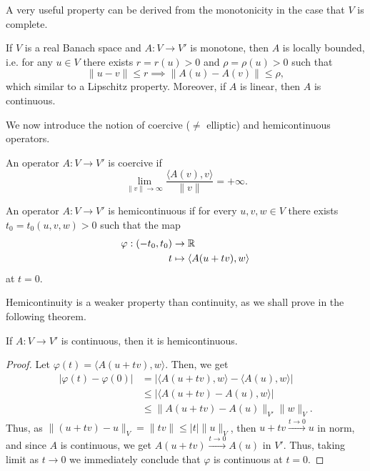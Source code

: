 A very useful property can be derived from the monotonicity in the case that $V$ is complete.
\begin{theorem}
    If $V$ is a real Banach space and $A:V\to V'$ is monotone, then $A$ is locally bounded, i.e. for any $u\in V$ there exists $r=r(u)>0$ and $\rho=\rho(u)>0$ such that
    \begin{equation*}
        \|u-v\|\leq r \implies \|A(u)-A(v)\|\leq \rho,
    \end{equation*}
    which similar to a Lipschitz property. Moreover, if $A$ is linear, then $A$ is continuous.
\end{theorem}
We now introduce the notion of coercive ($\neq$ elliptic) and hemicontinuous operators.
\begin{definition}
    An operator $A:V\to V'$ is coercive if 
    \begin{equation*}
        \lim_{\|v\|\to \infty} \frac{\langle A(v),v\rangle}{\|v\|} = +\infty.
    \end{equation*}
\end{definition}
\begin{definition}
    An operator $A:V\to V'$ is hemicontinuous if for every $u,v,w\in V$ there exists $t_0=t_0(u,v,w)>0$ such that the map 
    \begin{align*}
        \varphi:(-t_0,t_0)&\to \mathbb{R}\\
        t&\mapsto \langle A(u+tv),w\rangle
    \end{align*}
    at $t=0$. 
\end{definition}
Hemicontinuity is a weaker property than continuity, as we shall prove in the following theorem.
\begin{theorem}
    If $A:V\to V'$ is continuous, then it is hemicontinuous.
    \begin{proof}
        Let $\varphi(t)=\langle A(u+tv),w\rangle$. Then, we get
        \begin{align*}
            |\varphi(t)-\varphi(0)| &= |\langle A(u+tv),w\rangle - \langle A(u),w\rangle|\\
            &\leq |\langle A(u+tv)-A(u),w\rangle| \tag{Linearity of $A$}\\
            &\leq \|A(u+tv)-A(u)\|_{V'} \|w\|_V. \tag{Cauchy-Schwarz}
        \end{align*}
        Thus, as $\|(u+tv)-u\|_V=\|tv\|\leq |t|\|u\|_V$, then $u+tv\overset{t\to 0}{\to} u$ in norm, and since $A$ is continuous, we get $A(u+tv)\overset{t\to 0}{\to} A(u)$ in $V'$. Thus, taking limit as $t\to 0$ we immediately conclude that $\varphi$ is continuous at $t=0$.
    \end{proof}
\end{theorem}
